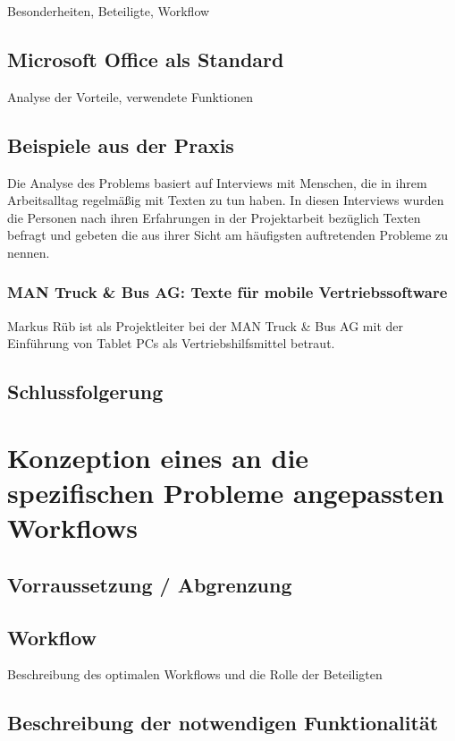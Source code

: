\documentclass[11pt,a4paper]{article}
\begin{document}
Besonderheiten, Beteiligte, Workflow

\subsection{Microsoft Office als Standard}

Analyse der Vorteile, verwendete Funktionen

\subsection{Beispiele aus der Praxis}

Die Analyse des Problems basiert auf Interviews mit Menschen, die in ihrem Arbeitsalltag regelmäßig mit Texten zu tun haben. In diesen Interviews wurden die Personen nach ihren Erfahrungen in der Projektarbeit bezüglich Texten befragt und gebeten die aus ihrer Sicht am häufigsten auftretenden Probleme zu nennen.

\subsubsection{MAN Truck \& Bus AG: Texte für mobile Vertriebssoftware}

Markus Rüb ist als Projektleiter bei der MAN Truck \& Bus AG mit der Einführung von Tablet PCs als Vertriebshilfsmittel betraut.

\subsection{Schlussfolgerung}

\section{Konzeption eines an die spezifischen Probleme angepassten Workflows}

\subsection{Vorraussetzung / Abgrenzung}

\subsection{Workflow}

Beschreibung des optimalen Workflows und die Rolle der Beteiligten

\subsection{Beschreibung der notwendigen Funktionalität}
\end{document}
